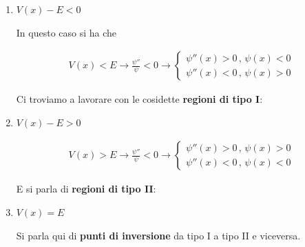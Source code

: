 \begin{enumerate}
	\item $V(x)-E<0$
	
	In questo caso si ha che 
	
	\begin{align}
	V(x)<E \rightarrow  \frac{\psi''}{\psi}<0 \rightarrow 
	\left\{
	\begin{array}{cc}
	\psi''(x) >0 \, , \, \psi(x)<0 \\
	\psi''(x) <0 \, , \, \psi(x)>0
	\end{array}
	\right.
	\end{align}
	
	Ci troviamo a lavorare con le cosidette \textbf{regioni di tipo I}:
	
	\begin{figure}[!htb]
	\end{figure}
	\newpage
	
	\item $V(x)-E>0$
	
	\begin{align}
	V(x)>E \rightarrow  \frac{\psi''}{\psi}<0 \rightarrow 
	\left\{
	\begin{array}{cc}
	\psi''(x) >0 \, , \, \psi(x)>0 \\
	\psi''(x) <0 \, , \, \psi(x)<0
	\end{array}
	\right.
	\end{align}
	
	E si parla di  \textbf{regioni di tipo II}:
	
	\begin{figure}[!htb]
	\end{figure}
	
	
	\item $V(x)=E$ 

	  Si parla qui di \textbf{punti di inversione} da tipo I a tipo II e viceversa.
\end{enumerate}

